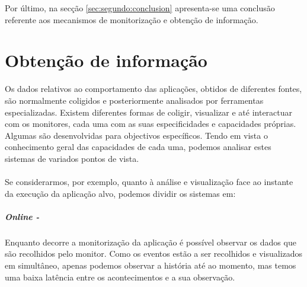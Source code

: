 Por último, na secção \ref{sec:segundo:conclusion} apresenta-se uma conclusão referente aos mecanismos de monitorização e obtenção de informação.


 


\section{Obtenção de informação}\label{sect:instrumentation_overview}

Os dados relativos ao comportamento das aplicações, obtidos de diferentes fontes, são normalmente coligidos e posteriormente analisados por ferramentas especializadas.
Existem diferentes formas de coligir, visualizar e até interactuar com os monitores, cada uma com as suas especificidades e capacidades próprias.
Algumas são desenvolvidas para objectivos específicos.
Tendo em vista o conhecimento geral das capacidades de cada uma, podemos analisar estes sistemas de variados pontos de vista.

\paragraph*{}
Se considerarmos, por exemplo, quanto à análise e visualização face ao instante da execução da aplicação alvo, podemos dividir os sistemas em:
 
\subparagraph*{Online -}
Enquanto decorre a monitorização da aplicação é possível observar os dados que são recolhidos pelo monitor.
Como os eventos estão a ser recolhidos e visualizados em simultâneo, apenas podemos observar a história até ao momento, mas temos uma baixa latência entre os acontecimentos e a sua observação.


